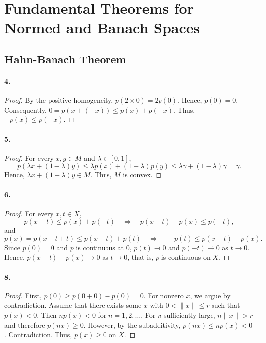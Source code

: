 \section{Fundamental Theorems for Normed and Banach Spaces}
\setcounter{subsection}{1}
\subsection{Hahn-Banach Theorem}
  \paragraph{4.}
  \begin{proof}
    By the positive homogeneity, $p(2\times 0)=2p(0)$. Hence, $p(0)=0$. 
    Consequently, $0=p(x+(-x))\le p(x)+p(-x)$. Thus, $-p(x)\le p(-x)$.
  \end{proof}
  
  \paragraph{5.}
  \begin{proof}
    For every $x,y\in M$ and $\lambda\in[0,1]$,
    \[
      p(\lambda x+(1-\lambda)y)\le \lambda p(x)+(1-\lambda)p(y)
      \le \lambda\gamma+(1-\lambda)\gamma=\gamma.
    \]
    Hence, $\lambda x+(1-\lambda)y\in M$. Thus, $M$ is convex.
  \end{proof}
  
  \paragraph{6.}
  \begin{proof}
    For every $x,t\in X$,
    \[
      p(x-t)\le p(x)+p(-t) \quad\Rightarrow\quad
      p(x-t)-p(x)\le p(-t),
    \]
    and
    \[
      p(x)=p(x-t+t)\le p(x-t)+p(t) \quad\Rightarrow\quad
      -p(t)\le p(x-t)-p(x).
    \]
    Since $p(0)=0$ and $p$ is continuous at $0$, $p(t)\to 0$ and $p(-t)\to 0$ as
    $t\to 0$. Hence, $p(x-t)-p(x)\to 0$ as $t\to 0$, that is, $p$ is continuous
    on $X$.
  \end{proof}
  
  \paragraph{8.}
  \begin{proof}
    First, $p(0)\ge p(0+0)-p(0)=0$. For nonzero $x$, we argue by contradiction.
    Assume that there exists some $x$ with $0<\|x\|\le r$ such that $p(x)<0$.
    Then $np(x)<0$ for $n=1,2,\dots$. For $n$ sufficiently large, $n\|x\|>r$ and 
    therefore $p(nx)\ge 0$. However, by the subadditivity, $p(nx)\le np(x)<0$.
    Contradiction. Thus, $p(x)\ge 0$ on $X$.
  \end{proof}
  
